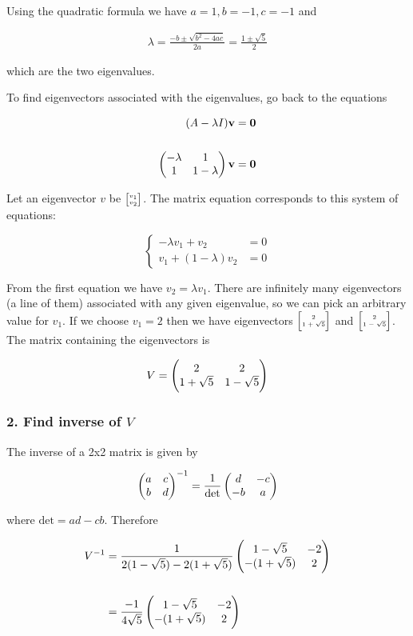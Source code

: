 Using the quadratic formula we have $a=1, b=-1, c=-1$ and

\begin{align*}
\lambda
= \frac{-b \pm \sqrt{b^2 - 4ac}}{2a}
= \frac{1 \pm \sqrt{5}}{2}
\end{align*}

which are the two eigenvalues.

To find eigenvectors associated with the eigenvalues, go back to the equations

\begin{align*}
(A - \lambda I)\mathbf v &= \mathbf 0
\\
\\
\begin{pmatrix}-\lambda & 1\\1        & 1 - \lambda\\ \end{pmatrix} \mathbf v &= \mathbf 0
\end{align*}

Let an eigenvector $v$ be $\tiny{\begin{bmatrix}v_1\\v_2\end{bmatrix}}$. The matrix equation corresponds
to this system of equations:

$$
\begin{cases}
-\lambda v_1 + v_2               &= 0\\
v_1          + (1 - \lambda) v_2 &= 0
\end{cases}
$$

From the first equation we have $v_2 = \lambda v_1$. There are infinitely many
eigenvectors (a line of them) associated with any given eigenvalue, so we can
pick an arbitrary value for $v_1$. If we choose $v_1=2$ then we have
eigenvectors $\tiny{\begin{bmatrix}2\\1+\sqrt 5\end{bmatrix}}$ and $\tiny{\begin{bmatrix}2\\1-\sqrt 5\end{bmatrix}}$. The matrix
containing the eigenvectors is

$$
V = \begin{pmatrix}2           & 2          \\1 + \sqrt 5 & 1 - \sqrt 5\\ \end{pmatrix}
$$


\subsubsection{2. Find inverse of $V$}

The inverse of a 2x2 matrix is given by

$$
\begin{pmatrix}a & c\\b & d\\ \end{pmatrix} ^ {-1}
=
\frac{1}{\text{det}} \begin{pmatrix}d & -c\\-b & a\\ \end{pmatrix}
$$

where $\text{det} = ad - cb$. Therefore

\begin{align*}
V^{-1}
&= \frac{1}{2(1 - \sqrt 5) - 2(1 + \sqrt 5)} \begin{pmatrix}1 - \sqrt 5  & -2\\-(1 + \sqrt 5) & 2\\ \end{pmatrix}
\\\\
&= \frac{-1}{4\sqrt 5} \begin{pmatrix}1 - \sqrt 5  & -2\\-(1 + \sqrt 5) & 2\\ \end{pmatrix}
\end{align*}


